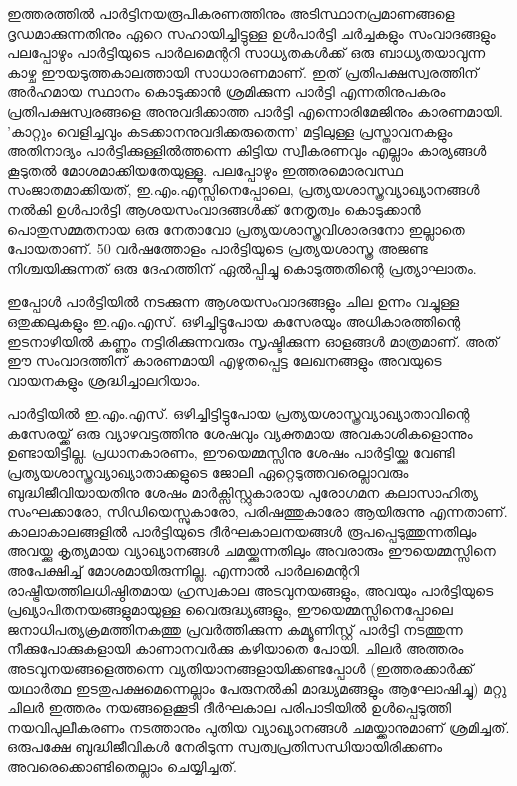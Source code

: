ഇത്തരത്തില്‍ പാര്‍ട്ടിനയരൂപികരണത്തിനും അടിസ്ഥാനപ്രമാണങ്ങളെ ദൃഡമാക്കുന്നതിനും ഏറെ സഹായിച്ചിട്ടുള്ള 
ഉള്‍പാര്‍ട്ടി ചര്‍ച്ചകളും സംവാദങ്ങളും പലപ്പോഴും പാര്‍ട്ടിയുടെ പാര്‍ലമെന്ററി സാധ്യതകള്‍ക്ക് ഒരു ബാധ്യതയാവുന്ന 
കാഴ്ച ഈയടുത്തകാലത്തായി സാധാരണമാണ്. ഇത് പ്രതിപക്ഷസ്വരത്തിന് അര്‍ഹമായ സ്ഥാനം കൊടുക്കാന്‍ 
ശ്രമിക്കുന്ന പാര്‍ട്ടി എന്നതിനുപകരം പ്രതിപക്ഷസ്വരങ്ങളെ അനുവദിക്കാത്ത പാര്‍ട്ടി എന്നൊരിമേജിനും കാരണമായി. 
'കാറ്റും വെളിച്ചവും കടക്കാനനുവദിക്കരുതെന്ന' മട്ടിലുള്ള പ്രസ്താവനകളും അതിനാദ്യം പാര്‍ട്ടിക്കുള്ളില്‍ത്തന്നെ കിട്ടിയ 
സ്വീകരണവും എല്ലാം കാര്യങ്ങള്‍ കൂടുതല്‍ മോശമാക്കിയതേയുള്ളൂ. പലപ്പോഴും ഇത്തരമൊരവസ്ഥ സംജാതമാക്കിയത്,
ഇ.എം.എസ്സിനെപ്പോലെ, പ്രത്യയശാസ്ത്രവ്യാഖ്യാനങ്ങള്‍ നല്‍കി ഉള്‍പാര്‍ട്ടി ആശയസംവാദങ്ങള്‍ക്ക് നേതൃത്വം കൊടുക്കാന്‍
പൊതുസമ്മതനായ ഒരു നേതാവോ പ്രത്യയശാസ്ത്രവിശാരദനോ ഇല്ലാതെ പോയതാണ്. 50 വര്‍ഷത്തോളം പാര്‍ട്ടിയുടെ 
പ്രത്യയശാസ്ത്ര അജണ്ട നിശ്ചയിക്കുന്നത് ഒരു ദേഹത്തിന് ഏല്‍പ്പിച്ചു കൊടുത്തതിന്റെ പ്രത്യാഘാതം.

ഇപ്പോള്‍ പാര്‍ട്ടിയില്‍ നടക്കുന്ന ആശയസംവാദങ്ങളും ചില ഉന്നം വച്ചുള്ള ഒതുക്കലുകളും ഇ.എം.എസ്. ഒഴിച്ചിട്ടുപോയ 
കസേരയും അധികാരത്തിന്റെ ഇടനാഴിയില്‍ കണ്ണും നട്ടിരിക്കുന്നവരും സൃഷ്ടിക്കുന്ന ഓളങ്ങള്‍ മാത്രമാണ്. അത് ഈ 
സംവാദത്തിന് കാരണമായി എഴുതപ്പെട്ട ലേഖനങ്ങളും അവയുടെ വായനകളും ശ്രദ്ധിച്ചാലറിയാം.

പാര്‍ട്ടിയില്‍ ഇ.എം.എസ്. ഒഴിച്ചിട്ടിട്ടുപോയ പ്രത്യയശാസ്ത്രവ്യാഖ്യാതാവിന്റെ കസേരയ്ക്ക് ഒരു വ്യാഴവട്ടത്തിനു ശേഷവും 
വ്യക്തമായ അവകാശികളൊന്നും ഉണ്ടായിട്ടില്ല. പ്രധാനകാരണം, ഈയെമ്മസ്സിനു ശേഷം പാര്‍ട്ടിയ്ക്കു വേണ്ടി 
പ്രത്യയശാസ്ത്രവ്യാഖ്യാതാക്കളുടെ ജോലി ഏറ്റെടുത്തവരെല്ലാവരും ബുദ്ധിജീവിയായതിനു ശേഷം മാര്‍ക്സിസ്റ്റുകാരായ 
പുരോഗമന കലാസാഹിത്യ സംഘക്കാരോ, സിഡിയെസ്സുകാരോ, പരിഷത്തുകാരോ ആയിരുന്നു എന്നതാണ്. 
കാലാകാലങ്ങളില്‍ പാര്‍ട്ടിയുടെ ദീര്‍ഘകാലനയങ്ങള്‍ രൂപപ്പെടുത്തുന്നതിലും അവയ്ക്കു കൃത്യമായ വ്യാഖ്യാനങ്ങള്‍ 
ചമയ്ക്കുന്നതിലും അവരാരും ഈയെമ്മസ്സിനെ അപേക്ഷിച്ച് മോശമായിരുന്നില്ല. എന്നാല്‍ പാര്‍ലമെന്ററി 
രാഷ്ട്രീയത്തിലധിഷ്ഠിതമായ ഹ്രസ്വകാല അടവുനയങ്ങളും, അവയും പാര്‍ട്ടിയുടെ പ്രഖ്യാപിതനയങ്ങളുമായുള്ള 
വൈരുദ്ധ്യങ്ങളും, ഈയെമ്മസ്സിനെപ്പോലെ ജനാധിപത്യക്രമത്തിനകത്തു പ്രവര്‍ത്തിക്കുന്ന കമ്യൂണിസ്റ്റ് പാര്‍ട്ടി നടത്തുന്ന 
നീക്കുപോക്കുകളായി കാണാനവര്‍ക്കു കഴിയാതെ പോയി. ചിലര്‍ അത്തരം അടവുനയങ്ങളെത്തന്നെ 
വ്യതിയാനങ്ങളായിക്കണ്ടപ്പോള്‍ (ഇത്തരക്കാര്‍ക്ക് യഥാര്‍ത്ഥ ഇടതുപക്ഷമെന്നെല്ലാം പേരുനല്‍കി മാദ്ധ്യമങ്ങളും 
ആഘോഷിച്ചു) മറ്റു ചിലര്‍ ഇത്തരം നയങ്ങളെക്കൂടി ദീര്‍ഘകാല പരിപാടിയില്‍ ഉള്‍പ്പെടുത്തി നയവിപുലീകരണം നടത്താനും 
പുതിയ വ്യാഖ്യാനങ്ങള്‍ ചമയ്ക്കാനുമാണ് ശ്രമിച്ചത്. ഒരുപക്ഷേ ബുദ്ധിജീവികള്‍ നേരിടുന്ന സ്വത്വപ്രതിസന്ധിയായിരിക്കണം 
അവരെക്കൊണ്ടിതെല്ലാം ചെയ്യിച്ചത്.

